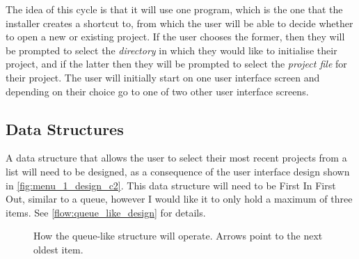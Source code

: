     The idea of this cycle is that it will use one program, which is the one that the installer creates a shortcut to, from which the user will be able to decide whether to open a new or existing project. 
    If the user chooses the former, then they will be prompted to select the \textit{directory} in which they would like to initialise their project, and if the latter then they will be prompted to select the \textit{project file} for their project. 
    The user will initially start on one user interface screen and depending on their choice go to one of two other user interface screens.

    \subsection{Data Structures}
    
        A data structure that allows the user to select their most recent projects from a list will need to be designed, as a consequence of the user interface design shown in \autoref{fig:menu_1_design_c2}.
        This data structure will need to be First In First Out, similar to a queue, however I would like it to only hold a maximum of three items. 
        See \autoref{flow:queue_like_design} for details.

        \begin{figure}[!ht]
            \centering
            \caption{How the queue-like structure will operate. Arrows point to the next oldest item.}
            \label{flow:queue_like_design}
        \end{figure}

